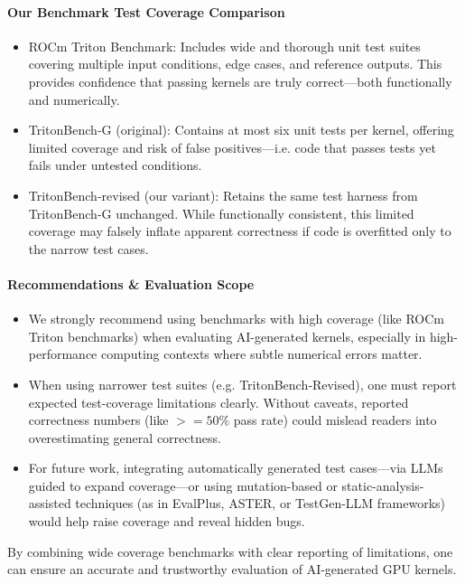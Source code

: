 \documentclass{article}
\begin{document}
\paragraph{Our Benchmark Test Coverage Comparison}
\begin{itemize}
\item ROCm Triton Benchmark: Includes wide and thorough unit test suites covering multiple input conditions, edge cases, and reference outputs. This provides confidence that passing kernels are truly correct—both functionally and numerically.

\item TritonBench‑G (original): Contains at most six unit tests per kernel, offering limited coverage and risk of false positives—i.e. code that passes tests yet fails under untested conditions.

\item TritonBench‑revised (our variant): Retains the same test harness from TritonBench‑G unchanged. While functionally consistent, this limited coverage may falsely inflate apparent correctness if code is overfitted only to the narrow test cases.

\end{itemize}

\paragraph{Recommendations \& Evaluation Scope}

\begin{itemize}
\item We strongly recommend using benchmarks with high coverage (like ROCm Triton benchmarks) when evaluating AI-generated kernels, especially in high-performance computing contexts where subtle numerical errors matter.
\item When using narrower test suites (e.g. TritonBench‑Revised), one must report expected test-coverage limitations clearly. Without caveats, reported correctness numbers (like $>=50$\% pass rate) could mislead readers into overestimating general correctness.
\item For future work, integrating automatically generated test cases—via LLMs guided to expand coverage—or using mutation-based or static-analysis-assisted techniques (as in EvalPlus, ASTER, or TestGen-LLM frameworks) would help raise coverage and reveal hidden bugs.
\end{itemize}

By combining wide coverage benchmarks with clear reporting of limitations, one can ensure an accurate and trustworthy evaluation of AI-generated GPU kernels.
\end{document}
